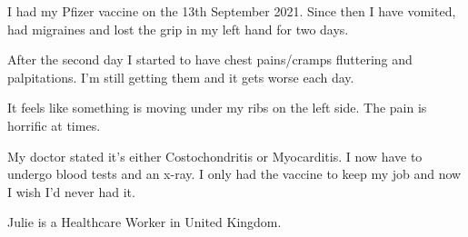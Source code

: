 I had my Pfizer vaccine on the 13th September 2021. Since then I have vomited,
had migraines and lost the grip in my left hand for two days.

After the second day I started to have chest pains/cramps fluttering and
palpitations. I’m still getting them and it gets worse each day.

It feels like something is moving under my ribs on the left side. The pain is
horrific at times.

My doctor stated it’s either Costochondritis or Myocarditis. I now have to
undergo blood tests and an x-ray. I only had the vaccine to keep my job and now
I wish I’d never had it.

Julie is a Healthcare Worker in United Kingdom.

